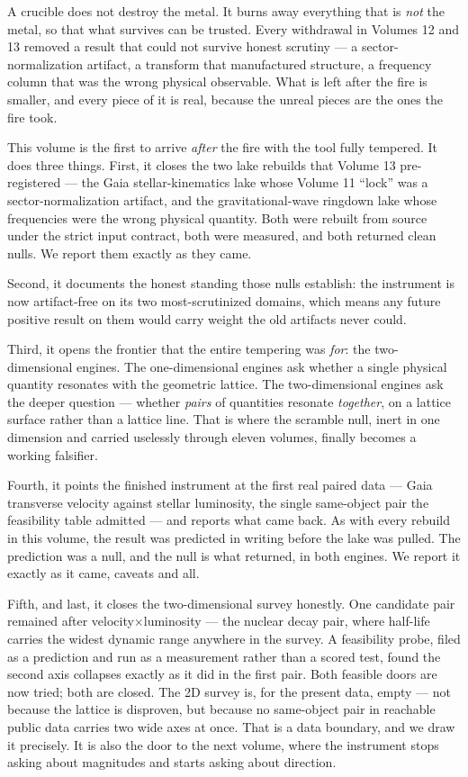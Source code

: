 \documentclass[11pt, letterpaper, openany]{book}
\begin{document}
\begin{signalbox}
A crucible does not destroy the metal. It burns away everything that is \emph{not} the metal,
so that what survives can be trusted. Every withdrawal in Volumes 12 and 13 removed a result
that could not survive honest scrutiny --- a sector-normalization artifact, a transform that
manufactured structure, a frequency column that was the wrong physical observable. What is left
after the fire is smaller, and every piece of it is real, because the unreal pieces are the ones
the fire took.
\end{signalbox}

This volume is the first to arrive \emph{after} the fire with the tool fully tempered. It does
three things. First, it closes the two lake rebuilds that Volume 13 pre-registered --- the Gaia
stellar-kinematics lake whose Volume 11 ``lock'' was a sector-normalization artifact, and the
gravitational-wave ringdown lake whose frequencies were the wrong physical quantity. Both were
rebuilt from source under the strict input contract, both were measured, and both returned
clean nulls. We report them exactly as they came.

Second, it documents the honest standing those nulls establish: the instrument is now
artifact-free on its two most-scrutinized domains, which means any future positive result on
them would carry weight the old artifacts never could.

Third, it opens the frontier that the entire tempering was \emph{for}: the two-dimensional
engines. The one-dimensional engines ask whether a single physical quantity resonates with the
geometric lattice. The two-dimensional engines ask the deeper question --- whether \emph{pairs}
of quantities resonate \emph{together}, on a lattice surface rather than a lattice line. That is
where the scramble null, inert in one dimension and carried uselessly through eleven volumes,
finally becomes a working falsifier.

Fourth, it points the finished instrument at the first real paired data --- Gaia
transverse velocity against stellar luminosity, the single same-object pair the feasibility
table admitted --- and reports what came back. As with every rebuild in this volume, the result
was predicted in writing before the lake was pulled. The prediction was a null, and the null is
what returned, in both engines. We report it exactly as it came, caveats and all.

Fifth, and last, it closes the two-dimensional survey honestly. One candidate pair remained
after velocity$\times$luminosity --- the nuclear decay pair, where half-life carries the widest
dynamic range anywhere in the survey. A feasibility probe, filed as a prediction and run as a
measurement rather than a scored test, found the second axis collapses exactly as it did in the
first pair. Both feasible doors are now tried; both are closed. The 2D survey is, for the
present data, empty --- not because the lattice is disproven, but because no same-object pair in
reachable public data carries two wide axes at once. That is a data boundary, and we draw it
precisely. It is also the door to the next volume, where the instrument stops asking about
magnitudes and starts asking about direction.
\end{document}
